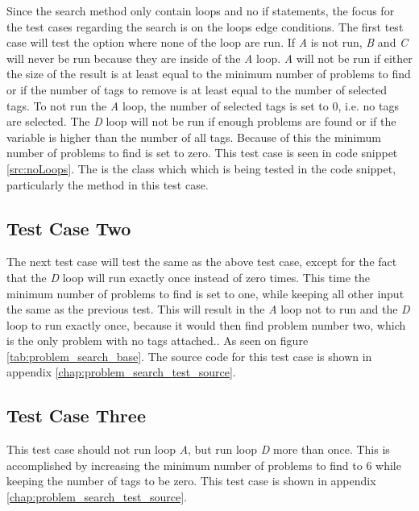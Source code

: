Since the search method only contain loops and no if statements, the focus for the test cases regarding the search is on the loops edge conditions.
The first test case will test the option where none of the loop are run.
If \textit{A} is not run, \textit{B} and \textit{C} will never be run because they are inside of the \textit{A} loop.
\textit{A} will not be run if either the size of the result is at least equal to the minimum number of problems to find or if the number of tags to remove is at least equal to the number of selected tags.
To not run the \textit{A} loop, the number of selected tags is set to 0, i.e. no tags are selected.
The \textit{D} loop will not be run if enough problems are found or if the  variable is higher than the number of all tags.
Because of this the minimum number of problems to find is set to zero.
This test case is seen in code snippet \ref{src:noLoops}.
The  is the class which which is being tested in the code snippet, particularly the  method in this test case.

\subsection{Test Case Two}
The next test case will test the same as the above test case, except for the fact that the \textit{D} loop will run exactly once instead of zero times.
This time the minimum number of problems to find is set to one, while keeping all other input the same as the previous test.
This will result in the \textit{A} loop not to run and the \textit{D} loop to run exactly once, because it would then find problem number two, which is the only problem with no tags attached.. As seen on figure \ref{tab:problem_search_base}.
The source code for this test case is shown in appendix \ref{chap:problem_search_test_source}.

\subsection{Test Case Three}
This test case should not run loop \textit{A}, but run loop \textit{D} more than once.
This is accomplished by increasing the minimum number of problems to find to 6 while keeping the number of tags to be zero.
This test case is shown in appendix \ref{chap:problem_search_test_source}.

